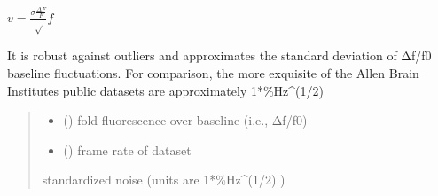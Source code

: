 \documentclass[letterpaper,10pt,english]{sphinxmanual}
\begin{document}
\begin{fulllineitems}
\label{\detokenize{CalSciPy.trace_processing:CalSciPy.trace_processing.calculate_standardized_noise}}
\pysigstartsignatures
{}
\pysigstopsignatures\begin{description}
\begin{DUlineblock}{0em}
\item[] \(v = \frac{\sigma \frac{\Delta F}F}\sqrt{f}\)
\end{DUlineblock}

\end{description}

\sphinxAtStartPar
It is robust against outliers and approximates the standard deviation of Δf/f0 baseline fluctuations.
For comparison, the more exquisite of the Allen Brain Institute\textquotesingle{}s public datasets are approximately 1*\%Hz\textasciicircum{}(\sphinxhyphen{}1/2)
\begin{quote}\begin{description}
\begin{itemize}
\item {} 
\sphinxAtStartPar
{} () \sphinxhyphen{}\sphinxhyphen{} fold fluorescence over baseline (i.e., Δf/f0)

\item {} 
\sphinxAtStartPar
{} () \sphinxhyphen{}\sphinxhyphen{} frame rate of dataset

\end{itemize}

\sphinxAtStartPar
standardized noise (units are  1*\%Hz\textasciicircum{}(\sphinxhyphen{}1/2) )

\sphinxAtStartPar
{}

\end{description}\end{quote}

\end{fulllineitems}
\end{document}
